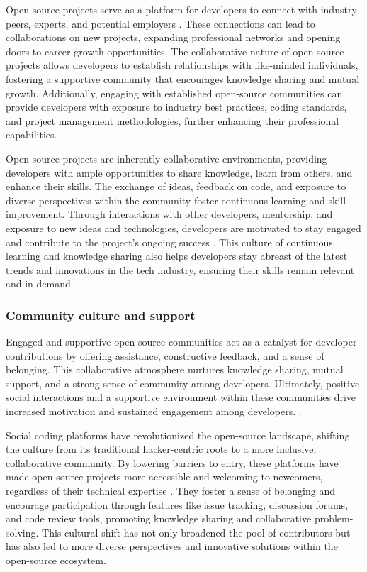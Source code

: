 Open-source projects serve as a platform for developers to connect with industry peers, experts, and potential employers \citep{10wu2007empirical,11gerosa2021shifting,13li2012leadership}. These connections can lead to collaborations on new projects, expanding professional networks and opening doors to career growth opportunities. The collaborative nature of open-source projects allows developers to establish relationships with like-minded individuals, fostering a supportive community that encourages knowledge sharing and mutual growth.  Additionally, engaging with established open-source communities can provide developers with exposure to industry best practices, coding standards, and project management methodologies, further enhancing their professional capabilities.

Open-source projects are inherently collaborative environments, providing developers with ample opportunities to share knowledge, learn from others, and enhance their skills. The exchange of ideas, feedback on code, and exposure to diverse perspectives within the community foster continuous learning and skill improvement. Through interactions with other developers, mentorship, and exposure to new ideas and technologies, developers are motivated to stay engaged and contribute to the project's ongoing success \citep{05bitzer2007intrinsic,06ye2003toward,09lakhani2005hackers,13li2012leadership}. This culture of continuous learning and knowledge sharing also helps developers stay abreast of the latest trends and innovations in the tech industry, ensuring their skills remain relevant and in demand.


\subsubsection{Community culture and support }

Engaged and supportive open-source communities act as a catalyst for developer contributions by offering assistance, constructive feedback, and a sense of belonging. This collaborative atmosphere nurtures knowledge sharing, mutual support, and a strong sense of community among developers. Ultimately, positive social interactions and a supportive environment within these communities drive increased motivation and sustained engagement among developers. \citep{10wu2007empirical,12choi2015characteristics,13li2012leadership,16ke2008motivations}.

Social coding platforms have revolutionized the open-source landscape, shifting the culture from its traditional hacker-centric roots to a more inclusive, collaborative community. By lowering barriers to entry, these platforms have made open-source projects more accessible and welcoming to newcomers, regardless of their technical expertise \citep{06ye2003toward,11gerosa2021shifting}. They foster a sense of belonging and encourage participation through features like issue tracking, discussion forums, and code review tools, promoting knowledge sharing and collaborative problem-solving. This cultural shift has not only broadened the pool of contributors but has also led to more diverse perspectives and innovative solutions within the open-source ecosystem.

